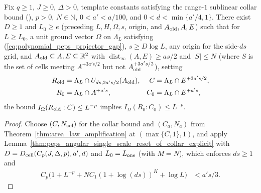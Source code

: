 \begin{lemma}
    \label{thm:peps_angular_single_scale_reset_of_collar}
    \leanok
    Fix $q\ge1$, $J\ge0$, $\Delta>0$, template constants satisfying the range-$1$ sublinear collar bound (\cite{gap:polypeps_angular_annular_geometry_scope}), $p>0$, $N\in\mathbb N$, $0<a'<a/100$, and $0<d<\min\{a'/4,1\}$.
    There exist $D\ge1$ and $L_0\ge e$ (preceding $L,H,\Omega,s$, origin, and $A_{\rm old},A,E$) such that for $L\ge L_0$, a unit ground vector $\Omega$ on $\Lambda_L$ satisfying (\ref{eq:polynomial_peps_projector_gap}), $s\ge D\log L$, any origin for the side-$ds$ grid, and $A_{\rm old}\subseteq A,E\subseteq\mathbb R^2$ with $\operatorname{dist}_\infty(A,E)\ge as/2$ and $|S|\le N$ (where $S$ is the set of cells meeting $A^{+3a's/2}$ but not $A_{\rm old}^{+3a's/2}$), setting
    \begin{align}
        R_{\rm old} & =\Lambda_L\cap U_{ds,3a's/2}(A_{\rm old}), &
        C           & =\Lambda_L\cap E^{+3a's/2}, \notag           \\
        R_0         & =\Lambda_L\cap A^{+a's},                   &
        C_0         & =\Lambda_L\cap E^{+a's}, \notag
    \end{align}
    the bound $I_\Omega(R_{\rm old}:C)\le L^{-p}$ implies $I_\Omega(R_0:C_0)\le L^{-p}$.
\end{lemma}
\begin{proof}\leanok
    Choose $(C,N_{\rm col})$ for the collar bound and $(C_a,N_a)$ from Theorem~\ref{thm:area_law_amplification} at $(\max\{C,1\},1)$, and apply Lemma~\ref{thm:peps_angular_single_scale_reset_of_collar_explicit} with $D=D_{\rm cell}(C_p(J,\Delta,p),a',d)$ and $L_0=L_{\rm one}$ (with $M=N$), which enforces $ds\ge1$ and
    \begin{align}
        C_p\bigl(1+L^{-p}+NC_1(1+\log(ds))^K+\log L\bigr)
         & <a's/3.
        \label{eq:peps_single_scale_width}
    \end{align}
\end{proof}

